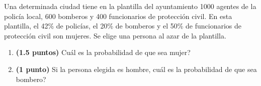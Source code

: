 
Una determinada ciudad tiene en la plantilla del ayuntamiento 1000 agentes
de la policía local, 600 bomberos y 400 funcionarios de protección civil.
En esta plantilla, el 42\% de policías, el 20\% de bomberos y el 50\% de
funcionarios de protección civil son mujeres. Se elige una persona al azar
de la plantilla.
\begin{enumerate}[label=\alph*)]
  \item \textbf{(1.5 puntos)} \textquestiondown{}Cuál es la probabilidad de
  que sea mujer?
  \item \textbf{(1 punto)} Si la persona elegida es hombre,
  \textquestiondown{}cuál es la probabilidad de que sea bombero?
\end{enumerate}
